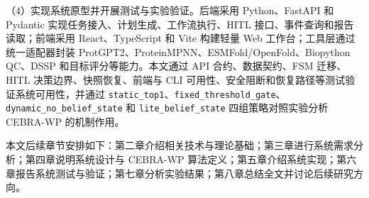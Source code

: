 （4）实现系统原型并开展测试与实验验证。后端采用 Python、FastAPI 和
Pydantic 实现任务接入、计划生成、工作流执行、HITL
接口、事件查询和报告读取；前端采用 React、TypeScript 和 Vite 构建轻量
Web 工作台；工具层通过统一适配器封装
ProtGPT2、ProteinMPNN、ESMFold/OpenFold、Biopython QC、DSSP
和目标评分等能力。本文通过 API 合约、数据契约、FSM 迁移、HITL
决策边界、快照恢复、前端与 CLI
可用性、安全阻断和恢复路径等测试验证系统可用性，并通过
\texttt{static\_top1}、\texttt{fixed\_threshold\_gate}、\texttt{dynamic\_no\_belief\_state}
和 \texttt{lite\_belief\_state} 四组策略对照实验分析 CEBRA-WP
的机制作用。

本文后续章节安排如下：第二章介绍相关技术与理论基础；第三章进行系统需求分析；第四章说明系统设计与
CEBRA-WP
算法定义；第五章介绍系统实现；第六章报告系统测试与验证；第七章分析实验结果；第八章总结全文并讨论后续研究方向。

